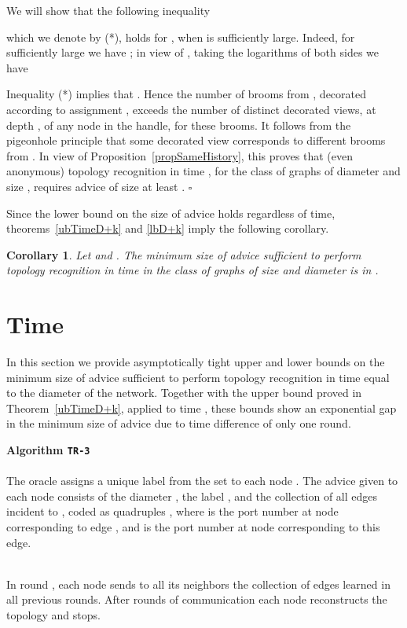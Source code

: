 \documentclass{article}
\newcommand*{\qed}{\hfill\ensuremath{\square}}
\newtheorem{corollary}{Corollary}[section]
\newenvironment{proof}{\noindent{\bf Proof:}}{\qed}
\newcommand{\algo}[1]{
\medskip
\noindent \textbf{Algorithm {\tt #1}}\\
\nopagebreak}
\newcommand{\procend}{\hfill \medskip}
\begin{document}
\begin{proof}
We will show that the following inequality

which we denote by (*),
holds for , when  is sufficiently large. 
 Indeed, for sufficiently large  we have ; in view of , taking the logarithms of both sides we have 
 

Inequality (*) implies that 
. Hence the number of brooms from , decorated according to assignment , exceeds the number of distinct decorated views, at depth , of any node in the handle, for these brooms. It follows {from the pigeonhole principle}  that some decorated view corresponds to different brooms from . In view of Proposition~\ref{propSameHistory}, this proves that (even anonymous) topology recognition in time , for the class of graphs of diameter  and size , requires advice of size at least .
\end{proof}

Since the lower bound  on the size of advice holds regardless of time, 
theorems~\ref{ubTimeD+k} and \ref{lbD+k} imply the following corollary.

\begin{corollary}\label{corD+k}
Let  and .
The minimum size of advice sufficient to perform topology recognition in time  in the class of graphs of size  and diameter  is in . 
\end{corollary}
\section{Time }


In this section we provide asymptotically tight upper and lower bounds on the minimum size of advice sufficient to perform topology recognition in time equal to the diameter  of the network.
Together with the upper bound proved in Theorem~\ref{ubTimeD+k}, applied to time , these bounds show an exponential gap in the minimum size of advice due to time difference of only one round.

\algo{TR-3}
\\
The oracle assigns a unique label  from the set  to each node .
The advice given to each node  consists of the diameter , the label , and the collection of all  edges incident to , coded as quadruples , where  is the port number at node  corresponding to edge , and  is the port number at node  corresponding to this edge.

\\
In round , each node sends to all its neighbors the collection of edges learned in all previous rounds. 
After  rounds of communication each node reconstructs the topology and stops.
\procend
\end{document}
